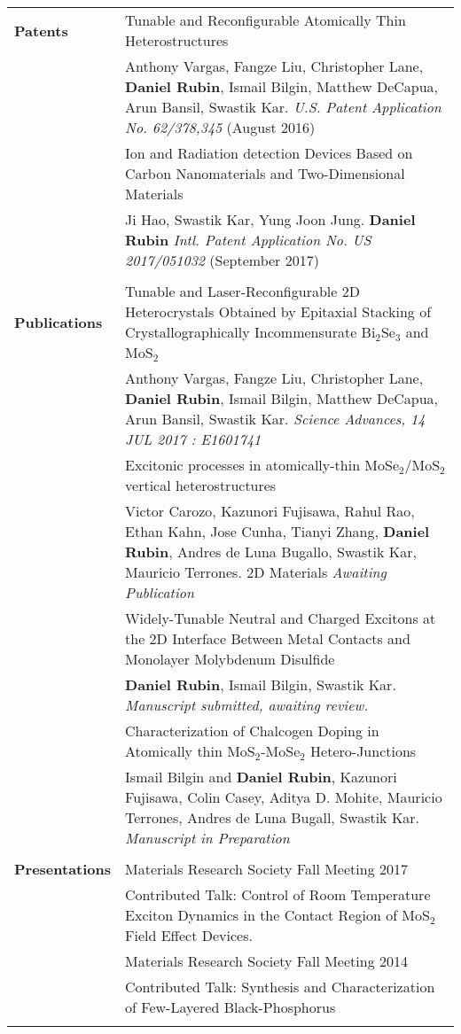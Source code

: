 \documentclass{article}
\begin{document}
\begin{center}
\begin{tabularx}{\linewidth}{>{\raggedright\bf\large{}}p{3.0cm}X}
Patents &  \large{Tunable and Reconfigurable Atomically Thin Heterostructures}\\
 & Anthony Vargas, Fangze Liu, Christopher Lane, {\bf Daniel Rubin}, Ismail Bilgin, Matthew DeCapua, Arun Bansil, Swastik Kar. {\it U.S. Patent Application No. 62/378,345}  (August 2016)\\
\rule{0pt}{0.5cm}  & \large{Ion and Radiation detection Devices Based on Carbon Nanomaterials and Two-Dimensional Materials}\\
 & Ji Hao, Swastik Kar, Yung Joon Jung. {\bf Daniel Rubin} {\it Intl. Patent Application No. US 2017/051032} (September 2017)\\
 & \\ %

Publications & \large{ Tunable and Laser-Reconfigurable 2D Heterocrystals Obtained by Epitaxial Stacking of Crystallographically Incommensurate Bi$_{2}$Se$_{3}$ and MoS$_{2}$}\\
 & Anthony Vargas, Fangze Liu,  Christopher Lane, {\bf Daniel Rubin}, Ismail Bilgin, Matthew DeCapua, Arun Bansil, Swastik Kar. {\it  Science Advances, 14 JUL 2017 : E1601741}\\
 \rule{0pt}{0.5cm}   & \large{Excitonic processes in atomically-thin MoSe$_2$/MoS$_2$ vertical heterostructures}\\
 & Victor Carozo, Kazunori Fujisawa, Rahul Rao, Ethan Kahn, Jose Cunha, Tianyi Zhang, {\bf Daniel Rubin}, Andres de Luna Bugallo, Swastik Kar, Mauricio Terrones. 2D Materials {\it Awaiting Publication}\\
 \rule{0pt}{0.5cm}   & \large{Widely-Tunable Neutral and Charged Excitons at the 2D Interface Between Metal Contacts and Monolayer Molybdenum Disulfide}\\
 & {\bf Daniel Rubin}, Ismail Bilgin, Swastik Kar. {\it Manuscript submitted, awaiting review.}\\
\rule{0pt}{0.5cm}  & \large{Characterization of Chalcogen Doping in Atomically thin MoS$_{2}$-MoSe$_{2}$ Hetero-Junctions}\\
 & Ismail Bilgin and {\bf Daniel Rubin}, Kazunori Fujisawa, Colin Casey, Aditya D. Mohite, Mauricio Terrones, Andres de Luna Bugall, Swastik Kar. \it{Manuscript in Preparation}\\
 & \\ %
 
Presentations & {\large Materials Research Society Fall Meeting 2017}\\
 & Contributed Talk: Control of Room Temperature Exciton Dynamics in the Contact Region of MoS$_2$ Field Effect Devices.\\
 & {\large Materials Research Society Fall Meeting 2014}\\
 & Contributed Talk: Synthesis and Characterization of Few-Layered Black-Phosphorus \\
 & \\ %


\end{tabularx}
\end{center}
\end{document}

